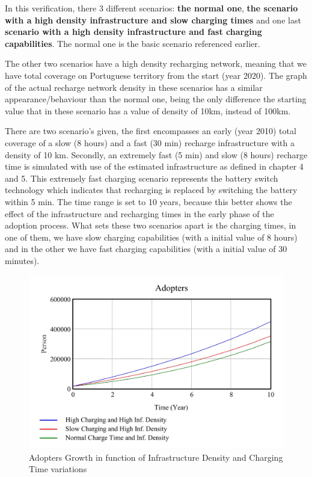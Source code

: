 In this verification, there 3 different scenarios: \textbf{the normal one}, \textbf{the scenario with a high density infrastructure and slow charging times} and one last \textbf{scenario with a high density infrastructure and fast charging capabilities}. The normal one is the basic scenario referenced earlier.

The other two scenarios have a high density recharging network, meaning that we have total coverage on Portuguese territory from the start (year 2020). The graph of the actual recharge network density in these scenarios has a similar appearance/behaviour than the normal one, being the only difference the starting value that in these scenario has a value of density of 10km, instead of 100km.

There are two scenario's given, the first encompasses an early (year 2010) total coverage of a slow (8 hours) and a fast (30 min) recharge infrastructure with a density of 10 km. Secondly, an extremely fast (5 min) and slow (8 hours) recharge time is simulated with use of the estimated infrastructure as defined in chapter 4 and 5. This extremely fast charging scenario represents the battery switch technology which indicates that recharging is replaced by switching the battery within 5 min. The time range is set to 10 years, because this better shows the effect of the infrastructure and recharging times in the early phase of the adoption process. What sets these two scenarios apart is the charging times, in one of them, we have slow charging capabilities (with a initial value of 8 hours) and in the other we have fast charging capabilities (with a initial value of 30 minutes).

\begin{figure}[htbp]
\centerline{\includegraphics[width=0.7\linewidth]{img/results-time-and-density.jpg}}
\caption{Adopters Growth in function of Infrastructure Density and Charging Time variations}
\label{fig:results-time-and-density}
\end{figure}

